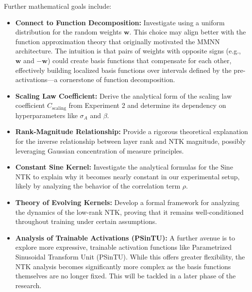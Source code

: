 \documentclass[a4paper]{article}
\theoremstyle{plain}
\theoremstyle{definition}
\theoremstyle{remark}
\begin{document}
\begin{tcolorbox}[colback=red!5,colframe=red!80!black,title={\textbf{Mathematical Investigations: Extended Goals}},enhanced,drop shadow,boxrule=2pt]
Further mathematical goals include:
\begin{itemize}
    \item \textbf{Connect to Function Decomposition:} Investigate using a uniform distribution for the random weights $\bm{w}$. This choice may align better with the function approximation theory that originally motivated the MMNN architecture. The intuition is that pairs of weights with opposite signs (e.g., $\bm{w}$ and $-\bm{w}$) could create basis functions that compensate for each other, effectively building localized basis functions over intervals defined by the pre-activations—a cornerstone of function decomposition.
    \item \textbf{Scaling Law Coefficient:} Derive the analytical form of the scaling law coefficient $C_{\text{scaling}}$ from Experiment 2 and determine its dependency on hyperparameters like $\sigma_A$ and $\beta$.
    \item \textbf{Rank-Magnitude Relationship:} Provide a rigorous theoretical explanation for the inverse relationship between layer rank and NTK magnitude, possibly leveraging Gaussian concentration of measure principles.
    \item \textbf{Constant Sine Kernel:} Investigate the analytical formulas for the Sine NTK to explain why it becomes nearly constant in our experimental setup, likely by analyzing the behavior of the correlation term $\rho$.
    \item \textbf{Theory of Evolving Kernels:} Develop a formal framework for analyzing the dynamics of the low-rank NTK, proving that it remains well-conditioned throughout training under certain assumptions.
    \item \textbf{Analysis of Trainable Activations (PSinTU):} A further avenue is to explore more expressive, trainable activation functions like Parametrized Sinusoidal Transform Unit (PSinTU). While this offers greater flexibility, the NTK analysis becomes significantly more complex as the basis functions themselves are no longer fixed. This will be tackled in a later phase of the research.
\end{itemize}
\end{tcolorbox}
\end{document}
